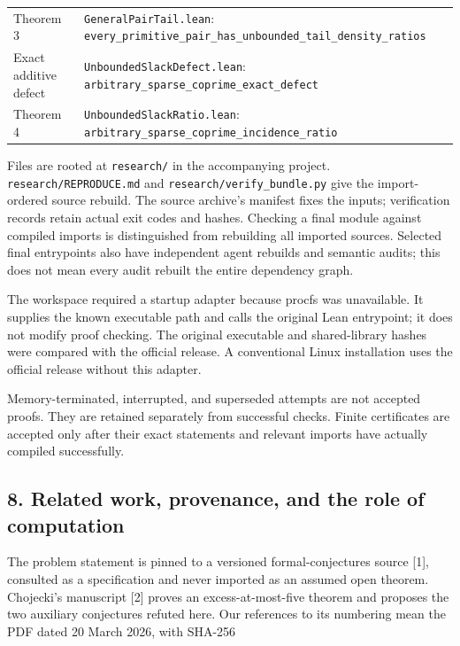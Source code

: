 \documentclass[
  11pt,
]{article}
\begin{document}
\begin{longtable}[]{@{}
  >{\raggedright\arraybackslash}p{}
  >{\raggedright\arraybackslash}p{}@{}}
Theorem 3 & \texttt{GeneralPairTail.\allowbreak{}lean}:
\texttt{every\_\allowbreak{}primitive\_\allowbreak{}pair\_\allowbreak{}has\_\allowbreak{}unbounded\_\allowbreak{}tail\_\allowbreak{}density\_\allowbreak{}ratios} \\
Exact additive defect & \texttt{UnboundedSlackDefect.\allowbreak{}lean}:
\texttt{arbitrary\_\allowbreak{}sparse\_\allowbreak{}coprime\_\allowbreak{}exact\_\allowbreak{}defect} \\
Theorem 4 & \texttt{UnboundedSlackRatio.\allowbreak{}lean}:
\texttt{arbitrary\_\allowbreak{}sparse\_\allowbreak{}coprime\_\allowbreak{}incidence\_\allowbreak{}ratio} \\
\end{longtable}

Files are rooted at \texttt{research/\allowbreak{}} in the accompanying project.
\texttt{research/\allowbreak{}REPRODUCE.\allowbreak{}md} and \texttt{research/\allowbreak{}verify\_\allowbreak{}bundle.\allowbreak{}py}
give the import-ordered source rebuild. The source archive's manifest
fixes the inputs; verification records retain actual exit codes and
hashes. Checking a final module against compiled imports is
distinguished from rebuilding all imported sources. Selected final
entrypoints also have independent agent rebuilds and semantic audits;
this does not mean every audit rebuilt the entire dependency graph.

The workspace required a startup adapter because procfs was unavailable.
It supplies the known executable path and calls the original Lean
entrypoint; it does not modify proof checking. The original executable
and shared-library hashes were compared with the official release. A
conventional Linux installation uses the official release without this
adapter.

Memory-terminated, interrupted, and superseded attempts are not accepted
proofs. They are retained separately from successful checks. Finite
certificates are accepted only after their exact statements and relevant
imports have actually compiled successfully.

\hypertarget{related-work-provenance-and-the-role-of-computation}{%
\subsection{8. Related work, provenance, and the role of
computation}\label{related-work-provenance-and-the-role-of-computation}}

The problem statement is pinned to a versioned formal-conjectures source
{[}1{]}, consulted as a specification and never imported as an assumed
open theorem. Chojecki's manuscript {[}2{]} proves an
excess-at-most-five theorem and proposes the two auxiliary conjectures
refuted here. Our references to its numbering mean the PDF dated 20
March 2026, with SHA-256
\end{document}
